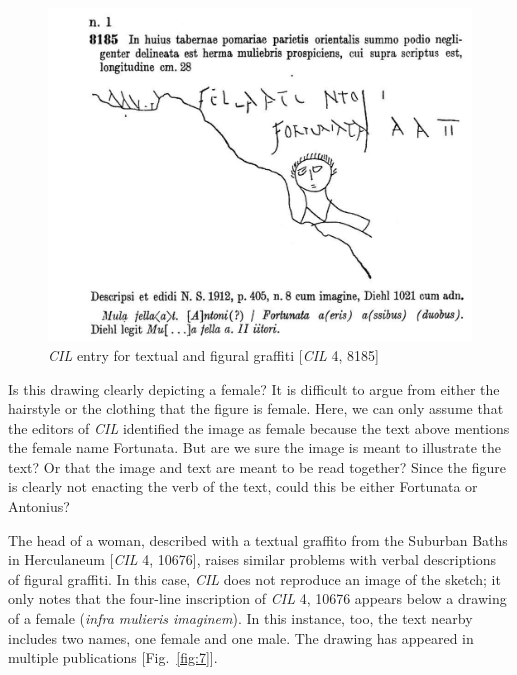 \documentclass[amsthm,ebook]{saparticle}
\begin{document}
\begin{figure}[!hbp]
\centering
 \includegraphics[width=\columnwidth]{EAGLE2016BenefielSypniewski-img006.jpg}
\caption{\emph{CIL} entry for textual and figural graffiti [\emph{CIL} 4, 8185]}
\label{fig:6}
\end{figure}




Is this drawing clearly depicting a female? It is difficult to argue from either the hairstyle or the clothing that the
figure is female. Here, we can only assume that the editors of \emph{CIL} identified the image as female because the text
above mentions the female name Fortunata. But are we sure the image is meant to illustrate the text? Or that the image
and text are meant to be read together? Since the figure is clearly not enacting the verb of the text, could this be
either Fortunata or Antonius?

The head of a woman, described with a textual graffito from the Suburban Baths in Herculaneum [\emph{CIL} 4, 10676], raises
similar problems with verbal descriptions of figural graffiti. In this case, \emph{CIL} does not reproduce an image of the
sketch; it only notes that the four-line inscription of \emph{CIL} 4, 10676 appears below a drawing of a female (\emph{infra
mulieris imaginem}). In this instance, too, the text nearby includes two names, one female and one male. The drawing has
appeared in multiple publications \citep{della_corte_loves_1960,deiss_herculaneum_1989,vivolo_pompei:_1993} [Fig.~\ref{fig:7}]. 
\end{document}
